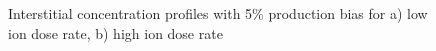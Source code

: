 \documentclass[a4paper]{article}
\begin{document}
      \begin{figure}[h!]  %
        \centering
        \qquad
        \caption{Interstitial concentration profiles with 5\% production bias for a) low ion dose rate, b) high ion dose rate}
        \label{figure:concentrations_ion_5_1e-3_5-5000nm}
      \end{figure}
\end{document}
